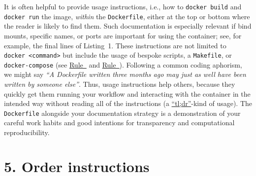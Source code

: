 \documentclass[10pt,letterpaper]{article}
\begin{document}
It is often helpful to provide usage instructions, i.e., how to
\texttt{docker\ build} and \texttt{docker\ run} the image, \emph{within}
the \texttt{Dockerfile}, either at the top or bottom where the reader is
likely to find them. Such documentation is especially relevant if bind
mounts, specific names, or ports are important for using the container;
see, for example, the final lines of Listing~1. These instructions are
not limited to \texttt{docker\ \textless{}command\textgreater{}} but
include the usage of bespoke scripts, a \texttt{Makefile}, or
\texttt{docker-compose} (see
\hyperref[{rule:interactive}]{Rule~} and
\hyperref[{rule:usage}]{Rule~}). Following a
common coding aphorism, we might say \emph{``A Dockerfile written three
months ago may just as well have been written by someone else''}. Thus,
usage instructions help others, because they quickly get them running
your workflow and interacting with the container in the intended way
without reading all of the instructions (a
\href{https://en.wikipedia.org/wiki/Wikipedia:Too_long;_didn\%27t_read}{``tl;dr''}-kind
of usage). The \texttt{Dockerfile} alongside your documentation strategy
is a demonstration of your careful work habits and good intentions for
transparency and computational reproducibility.

\hypertarget{order-instructions}{%
\section{5. Order instructions}\label{order-instructions}}

  \label{rule:order} 
\end{document}
